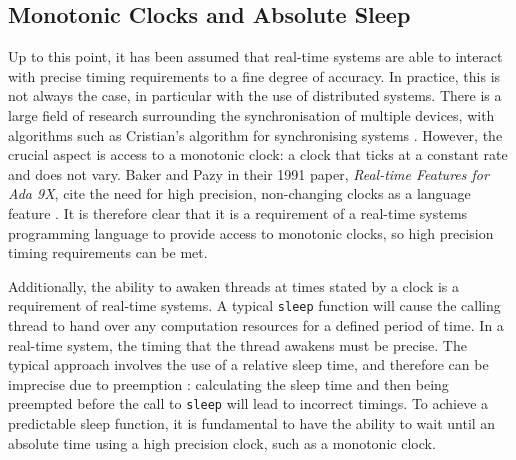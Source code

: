 \subsection{Monotonic Clocks and Absolute Sleep}
Up to this point, it has been assumed that real-time systems are able to
interact with precise timing requirements to a fine degree of accuracy.  
In practice, this is not always the case, in particular with the use
of distributed systems. There is a large field of research surrounding the
synchronisation of multiple devices, with algorithms such as Cristian's
algorithm for synchronising systems \cite{37958}. However, the crucial aspect is 
access to a monotonic clock: a clock that ticks at a constant rate and does
not vary. Baker and Pazy in their 1991 paper,\emph{ Real-time Features for Ada
9X},
cite the need for high precision, non-changing clocks as a language feature \cite{160371}.  
It is therefore clear that it is a requirement of a real-time systems
programming language to provide access to monotonic clocks, so high
precision timing requirements can be met.  
\par\bigskip\noindent
Additionally,
the ability to awaken threads at times stated by a clock is a requirement of
real-time systems. A typical \texttt{sleep} function will cause the calling
thread to hand over any computation resources for a defined period of time.  In
a real-time system, the timing that the thread awakens must be precise.  The
typical approach involves the use of a relative sleep time, and therefore can
be imprecise due to preemption \cite{real-time-systems}: calculating the sleep
time and then being preempted before the call to \texttt{sleep} will lead to
incorrect timings. To achieve a predictable sleep function, it is fundamental 
to have the ability to wait until an absolute time using a high precision clock, 
such as a monotonic
clock.

